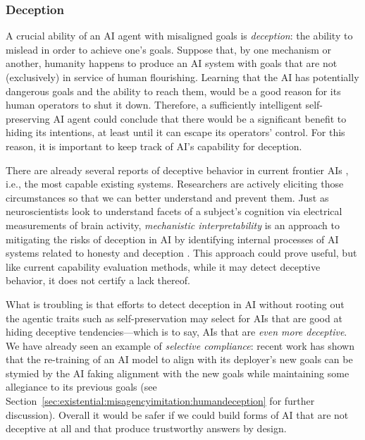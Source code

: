     \subsubsection{Deception}
    \label{sec:existential:lossofcontrol:deception}

A crucial ability of an AI agent with misaligned goals is \emph{deception}: the ability to mislead in order to achieve one's goals.
Suppose that, by one mechanism or another, humanity happens to produce an AI system with goals that are not (exclusively) in service of human flourishing.
Learning that the AI has potentially dangerous goals and the ability to reach them, would be a good reason for its human operators to shut it down.
Therefore, a sufficiently intelligent self-preserving AI agent could conclude that there would be a significant benefit to hiding its intentions, at least until it can escape its operators’ control.
For this reason, it is important to keep track of AI's capability for deception.

There are already several reports of deceptive behavior in current frontier AIs \cite{arxiv.org.abs.2412.04984,arxiv.org.abs.2405.01576,www.cell.com.patterns.fulltext.S2666.3899.2824.2900103.X.s.08}, i.e., the most capable existing systems. Researchers are actively eliciting those circumstances so that we can better understand and prevent them. 
Just as neuroscientists look to understand facets of a subject's cognition via electrical measurements of brain activity, \emph{mechanistic interpretability} is an approach to mitigating the risks of deception in AI by identifying internal processes of AI systems related to honesty and deception \cite{arxiv.org.abs.2404.14082}.
This approach could prove useful, but like current capability evaluation methods, while it may detect deceptive behavior, it does not certify a lack thereof. 

What is troubling is that efforts to detect deception in AI without rooting out the agentic traits such as self-preservation may select for AIs that are good at hiding deceptive tendencies---which is to say, AIs that are \emph{even more deceptive}. We have already seen an example of \emph{selective compliance}: recent work \cite{arxiv.org.abs.2412.14093} has shown that the re-training of an AI model to align with its deployer’s new goals can be stymied by the AI faking alignment with the new goals while maintaining some allegiance to its previous goals (see Section~\ref{sec:existential:misagencyimitation:humandeception} for further discussion). Overall it would be safer if we could build forms of AI that are not deceptive at all and that produce trustworthy answers by design.


